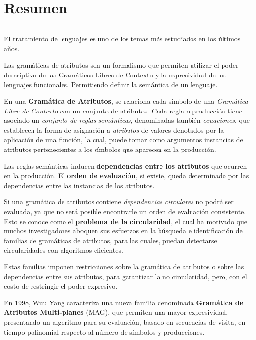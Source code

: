 \documentclass[a4paper,11pt]{ThesisStyle}
\begin{document}
\dominitoc
{}


 \cleardoublepage
\chapter*{Resumen}
\noindent\rule[2pt]{\textwidth}{0.5pt}
El tratamiento de lenguajes es uno de los temas más estudiados en los últimos años.

Las gramáticas de atributos son un formalismo que permiten utilizar el poder descriptivo de las Gramáticas Libres de Contexto y la expresividad de los lenguajes funcionales. Permitiendo definir la semántica de un lenguaje.

En una \textbf{Gramática de Atributos}, se relaciona cada símbolo de una \textit{Gramática Libre de Contexto} con un conjunto de atributos. Cada regla o producción tiene asociado un \textit{conjunto de reglas semánticas}, denominadas también \textit{ecuaciones}, que establecen la forma de asignación a \textit{atributos} de valores denotados por la aplicación de una función, la cual, puede tomar como argumentos instancias de atributos pertenecientes a los símbolos que aparecen en la producción.

Las reglas semánticas inducen \textbf{dependencias entre los atributos} que ocurren en la producción. El \textbf{orden de evaluación}, si existe, queda determinado por las dependencias entre las instancias de los atributos.

Si una gramática de atributos contiene \textit{dependencias circulares} no podrá ser evaluada, ya que no será posible encontrarle un orden de evaluación consistente. Esto se conoce como el \textbf{problema de la circularidad}, el cual ha motivado que muchos investigadores aboquen sus esfuerzos en la búsqueda e identificación de familias de gramáticas de atributos, para las cuales, puedan detectarse circularidades con algoritmos eficientes.

Estas familias imponen restricciones sobre la gramática de atributos o sobre las dependencias entre sus atributos, para garantizar la no circularidad, pero, con el costo de restringir el poder expresivo.

En 1998, Wuu Yang caracteriza una nueva familia denominada \textbf{Gramática de Atributos Multi-planes} (MAG), que permiten una mayor expresividad, presentando un algoritmo para su evaluación, basado en secuencias de visita, en tiempo polinomial respecto al número de símbolos y producciones.
\end{document}
